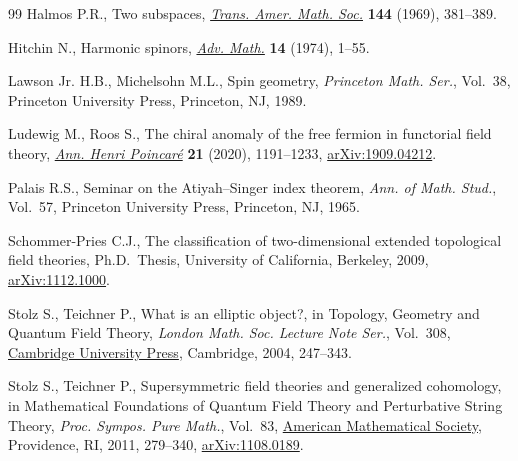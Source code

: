 \documentclass[10pt,a4paper]{amsart}
\numberwithin{equation}{section}
\begin{document}
\begin{thebibliography}{99}
Halmos P.R., Two subspaces, \href{https://doi.org/10.2307/1995288}{\textit{Trans. Amer. Math. Soc.}} \textbf{144}
 (1969), 381--389.

Hitchin N., Harmonic spinors, \href{https://doi.org/10.1016/0001-8708(74)90021-8}{\textit{Adv. Math.}} \textbf{14} (1974), 1--55.

Lawson Jr. H.B., Michelsohn M.L., Spin geometry, \textit{Princeton Math. Ser.},
 Vol.~38, Princeton University Press, Princeton, NJ, 1989.

Ludewig M., Roos S., The chiral anomaly of the free fermion in functorial field
 theory, \href{https://doi.org/10.1007/s00023-020-00893-6}{\textit{Ann. Henri Poincar\'e}} \textbf{21} (2020), 1191--1233,
 \href{https://arxiv.org/abs/1909.04212}{arXiv:1909.04212}.

Palais R.S., Seminar on the {A}tiyah--{S}inger index theorem, \textit{Ann. of
 Math. Stud.}, Vol.~57, Princeton University Press, Princeton, NJ, 1965.

Schommer-Pries C.J., The classification of two-dimensional extended topological
 field theories, Ph.D.~Thesis, {U}niversity of {C}alifornia, Berkeley, 2009,
 \href{https://arxiv.org/abs/1112.1000}{arXiv:1112.1000}.

Stolz S., Teichner P., What is an elliptic object?, in Topology, {G}eometry and
 {Q}uantum {F}ield {T}heory, \textit{London Math. Soc. Lecture Note Ser.},
 Vol.~308, \href{https://doi.org/10.1017/CBO9780511526398.013}{Cambridge University Press}, Cambridge, 2004, 247--343.

Stolz S., Teichner P., Supersymmetric field theories and generalized
 cohomology, in Mathematical {F}oundations of {Q}uantum {F}ield {T}heory and
 {P}erturbative {S}tring {T}heory, \textit{Proc. Sympos. Pure Math.}, Vol.~83,
 \href{https://doi.org/10.1090/pspum/083/2742432}{American Mathematical Society}, Providence, RI, 2011, 279--340,
 \href{https://arxiv.org/abs/1108.0189}{arXiv:1108.0189}.

\end{thebibliography}
\end{document}
